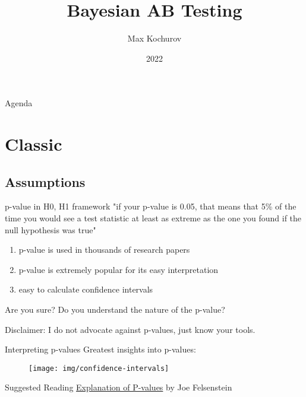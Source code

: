 \documentclass{beamer}
\author{Max Kochurov}
\title[Practical Bayes - Bayesian AB Testing]{Bayesian AB Testing}
\institute[MSU]{Moscow State University}
\date{2022}
\begin{document}
\begin{frame}
	\maketitle
\end{frame}

\begin{frame}{Agenda}
\tableofcontents
\end{frame}
\section{Classic}
\subsection{Assumptions}
\begin{frame}{p-value in H0, H1 framework}
"if your p-value is 0.05, that means that 5\% of the time you would see a test statistic at least as extreme as the one you found if the null hypothesis was true"

    \begin{enumerate}
        \item p-value is used in thousands of research papers
        \item p-value is extremely popular for its easy interpretation
        \item easy to calculate confidence intervals
    \end{enumerate}
    \pause
    \begin{alertblock}{Are you sure?}
    Do you understand the nature of the p-value?
    \end{alertblock}
    Disclaimer: I do not advocate against p-values, just know your tools.
\end{frame}
\begin{frame}{Interpreting p-values}
Greatest insights into p-values:
\begin{figure}
    \centering
    \texttt{[image: img/confidence-intervals]}
\end{figure}
\begin{block}{Suggested Reading}
\href{https://evolution.gs.washington.edu/gs560/2011/lecture3.pdf}{Explanation of P-values} by Joe Felsenstein
\end{block}
\end{frame}
\end{document}
